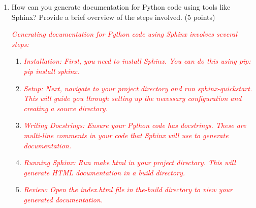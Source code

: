 \documentclass{article}
\begin{document}
\begin{enumerate}
        \item How can you generate documentation for Python code using tools like
        Sphinx? Provide a brief overview of the steps involved. (5 points) \par
        \textcolor{red}{\textit{Generating documentation for Python code using Sphinx involves several steps:}}
        \begin{enumerate}
            \item \textcolor{red}{\textit{Installation: First, you need to install Sphinx. You can do this using pip: pip install sphinx.}} \par
            \item \textcolor{red}{\textit{Setup: Next, navigate to your project directory and run sphinx-quickstart. 
            This will guide you through setting up the necessary configuration and creating a source directory.}} \par
            \item \textcolor{red}{\textit{Writing Docstrings: Ensure your Python code has docstrings. These are multi-line 
            comments in your code that Sphinx will use to generate documentation.}}\par
            \item \textcolor{red}{\textit{Running Sphinx: Run make html in your project directory. 
            This will generate HTML documentation in a build directory.}}\par
            \item \textcolor{red}{\textit{Review: Open the index.html file in the-build directory to view your generated documentation.}}
        \end{enumerate}


\end{enumerate}
\end{document}
